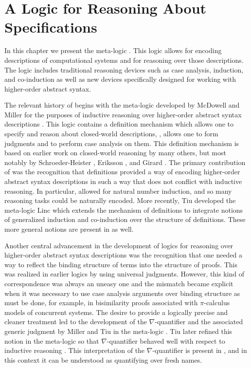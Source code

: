 
\chapter{A Logic for Reasoning About Specifications}
\label{ch:meta-logic}

In this chapter we present the meta-logic \logic. This logic allows
for encoding descriptions of computational systems and for reasoning
over those descriptions. The logic includes traditional reasoning
devices such as case analysis, induction, and co-induction as well as
new devices specifically designed for working with higher-order abstract
syntax.

The relevant history of \logic begins with the meta-logic \FOLDN
developed by McDowell and Miller for the purposes of inductive
reasoning over higher-order abstract syntax descriptions
\cite{mcdowell02tocl, mcdowell00tcs}. This logic contains a definition
mechanism which allows one to specify and reason about closed-world
descriptions, \ie, allows one to form judgments and to perform case
analysis on them. This definition mechanism is based on earlier work
on closed-world reasoning by many others, but most notably by
Schroeder-Heister \cite{schroeder-Heister93lics}, Eriksson
\cite{eriksson91elp}, and Girard \cite{girard92mail}. The primary
contribution of \FOLDN was the recognition that definitions provided a
way of encoding higher-order abstract syntax descriptions in such a
way that does not conflict with inductive reasoning. In particular,
\FOLDN allowed for natural number induction, and so many reasoning
tasks could be naturally encoded. More recently, Tiu \cite{tiu04phd}
developed the meta-logic Linc which extends the mechanism of
definitions to integrate notions of generalized induction and
co-induction over the structure of definitions. These more general
notions are present in \logic as well.

Another central advancement in the development of logics for reasoning
over higher-order abstract syntax descriptions was the recognition
that one needed a way to reflect the binding structure of terms into
the structure of proofs. This was realized in earlier logics by using
universal judgments. However, this kind of correspondence was always
an uneasy one and the mismatch became explicit when it was necessary
to use case analysis arguments over binding structure as must be done,
for example, in bisimilarity proofs associated with $\pi$-calculus
models of concurrent systems. The desire to provide a logically
precise and cleaner treatment led to the development of the
$\nabla$-quantifier and the associated generic judgment by Miller and
Tiu in the meta-logic \foldnb \cite{miller05tocl}. Tiu later refined
this notion in the meta-logic \LG so that $\nabla$-quantifier behaved
well with respect to inductive reasoning \cite{tiu06lfmtp}. This
interpretation of the $\nabla$-quantifier is present in \logic, and in
this context it can be understood as quantifying over fresh names.

